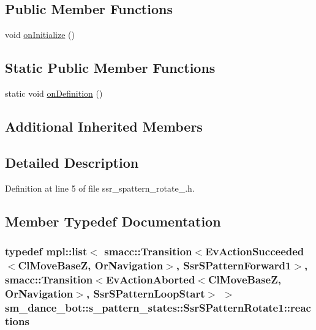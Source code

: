 \subsection*{Public Member Functions}
\begin{DoxyCompactItemize}
\item 
void \hyperlink{structsm__dance__bot_1_1s__pattern__states_1_1SsrSPatternRotate1_a2c75a2f6838c243adbed094afa2f183a}{on\+Initialize} ()
\end{DoxyCompactItemize}
\subsection*{Static Public Member Functions}
\begin{DoxyCompactItemize}
\item 
static void \hyperlink{structsm__dance__bot_1_1s__pattern__states_1_1SsrSPatternRotate1_a98778ce83a8e151467104da0efb9ab54}{on\+Definition} ()
\end{DoxyCompactItemize}
\subsection*{Additional Inherited Members}


\subsection{Detailed Description}


Definition at line 5 of file ssr\+\_\+spattern\+\_\+rotate\+\_.\+h.



\subsection{Member Typedef Documentation}
\subsubsection[{\texorpdfstring{reactions}{reactions}}]{\setlength{\rightskip}{0pt plus 5cm}typedef mpl\+::list$<$ {\bf smacc\+::\+Transition}$<$Ev\+Action\+Succeeded$<${\bf Cl\+Move\+BaseZ}, {\bf Or\+Navigation}$>$, {\bf Ssr\+S\+Pattern\+Forward1}$>$, {\bf smacc\+::\+Transition}$<$Ev\+Action\+Aborted$<${\bf Cl\+Move\+BaseZ}, {\bf Or\+Navigation}$>$, {\bf Ssr\+S\+Pattern\+Loop\+Start}$>$ $>$ {\bf sm\+\_\+dance\+\_\+bot\+::s\+\_\+pattern\+\_\+states\+::\+Ssr\+S\+Pattern\+Rotate1\+::reactions}}\hypertarget{structsm__dance__bot_1_1s__pattern__states_1_1SsrSPatternRotate1_a19ca92dae97d24dd856edc8aa90d35e4}{}\label{structsm__dance__bot_1_1s__pattern__states_1_1SsrSPatternRotate1_a19ca92dae97d24dd856edc8aa90d35e4}


